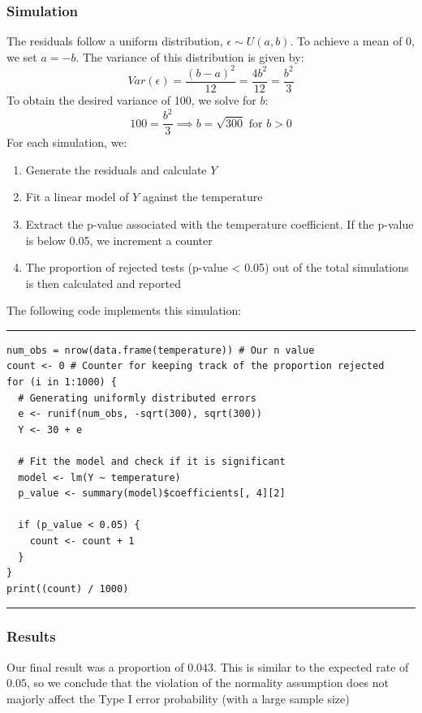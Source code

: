 \documentclass{article}
\begin{document}
\subsubsection*{Simulation}
The residuals follow a uniform distribution, $\epsilon \sim U(a,b)$. To achieve a mean of 0, we set $a=-b$. The variance of this distribution is given by:
$$Var(\epsilon) = \frac{(b-a)^2}{12} = \frac{4b^2}{12} = \frac{b^2}{3}$$
To obtain the desired variance of 100, we solve for $b$:
$$100 = \frac{b^2}{3} \implies b = \sqrt{300} \text{ for } b > 0$$
For each simulation, we:
\begin{enumerate}
    \item Generate the residuals and calculate $Y$
    \item Fit a linear model of $Y$ against the temperature
    \item Extract the p-value associated with the temperature coefficient. If the p-value is below 0.05, we increment a counter
    \item The proportion of rejected tests (p-value < 0.05) out of the total simulations is then calculated and reported
\end{enumerate}
The following code implements this simulation:
\par\noindent\rule{\textwidth}{0.4pt}
\vspace{-25pt} %
\begin{verbatim}
num_obs = nrow(data.frame(temperature)) # Our n value
count <- 0 # Counter for keeping track of the proportion rejected
for (i in 1:1000) {
  # Generating uniformly distributed errors
  e <- runif(num_obs, -sqrt(300), sqrt(300))
  Y <- 30 + e

  # Fit the model and check if it is significant
  model <- lm(Y ~ temperature)
  p_value <- summary(model)$coefficients[, 4][2]
  
  if (p_value < 0.05) {
    count <- count + 1
  }
}
print((count) / 1000)
\end{verbatim}
\vspace{-15pt} %
\par\noindent\rule{\textwidth}{0.4pt}
\subsubsection*{Results}
Our final result was a proportion of $0.043$. This is similar to the expected rate of $0.05$, so we conclude that the violation of the normality assumption does not majorly affect the Type I error probability (with a large sample size)
\end{document}
